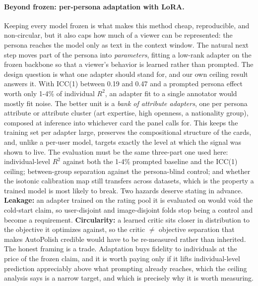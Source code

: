 \documentclass{article}
\begin{document}
\paragraph{Beyond frozen: per-persona adaptation with LoRA.} Keeping every model frozen is what makes this method cheap, reproducible, and non-circular, but it also caps how much of a viewer can be represented: the persona reaches the model only as text in the context window. The natural next step moves part of the persona into \emph{parameters}, fitting a low-rank adapter \citep{hu2022lora} on the frozen backbone so that a viewer's behavior is learned rather than prompted. The design question is what one adapter should stand for, and our own ceiling result answers it. With ICC(1) between 0.19 and 0.47 and a prompted persona effect worth only 1-4\% of individual $R^2$, an adapter fit to a single annotator would mostly fit noise. The better unit is a \emph{bank of attribute adapters}, one per persona attribute or attribute cluster (art expertise, high openness, a nationality group), composed at inference into whichever card the panel calls for. This keeps the training set per adapter large, preserves the compositional structure of the cards, and, unlike a per-user model, targets exactly the level at which the signal was shown to live. The evaluation must be the same three-part one used here: individual-level $R^2$ against both the 1-4\% prompted baseline and the ICC(1) ceiling; between-group separation against the persona-blind control; and whether the isotonic calibration map still transfers across datasets, which is the property a trained model is most likely to break. Two hazards deserve stating in advance. \textbf{Leakage:} an adapter trained on the rating pool it is evaluated on would void the cold-start claim, so user-disjoint and image-disjoint folds stop being a control and become a requirement. \textbf{Circularity:} a learned critic sits closer in distribution to the objective it optimizes against, so the critic $\neq$ objective separation that makes AutoPolish credible would have to be re-measured rather than inherited. The honest framing is a trade. Adaptation buys fidelity to individuals at the price of the frozen claim, and it is worth paying only if it lifts individual-level prediction appreciably above what prompting already reaches, which the ceiling analysis says is a narrow target, and which is precisely why it is worth measuring.


\end{document}
